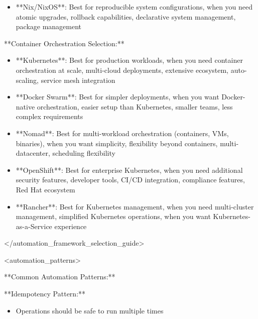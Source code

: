 \documentclass[11pt,a4paper]{article}
\begin{document}
\begin{itemize}
\item **Nix/NixOS**: Best for reproducible system configurations, when you need atomic upgrades, rollback capabilities, declarative system management, package management
\end{itemize}

**Container Orchestration Selection:**

\begin{itemize}
\item **Kubernetes**: Best for production workloads, when you need container orchestration at scale, multi-cloud deployments, extensive ecosystem, auto-scaling, service mesh integration
\end{itemize}

\begin{itemize}
\item **Docker Swarm**: Best for simpler deployments, when you want Docker-native orchestration, easier setup than Kubernetes, smaller teams, less complex requirements
\end{itemize}

\begin{itemize}
\item **Nomad**: Best for multi-workload orchestration (containers, VMs, binaries), when you want simplicity, flexibility beyond containers, multi-datacenter, scheduling flexibility
\end{itemize}

\begin{itemize}
\item **OpenShift**: Best for enterprise Kubernetes, when you need additional security features, developer tools, CI/CD integration, compliance features, Red Hat ecosystem
\end{itemize}

\begin{itemize}
\item **Rancher**: Best for Kubernetes management, when you need multi-cluster management, simplified Kubernetes operations, when you want Kubernetes-as-a-Service experience
\end{itemize}

</automation\_framework\_selection\_guide>

<automation\_patterns>

**Common Automation Patterns:**

**Idempotency Pattern:**

\begin{itemize}
\item Operations should be safe to run multiple times
\end{itemize}
\end{document}
